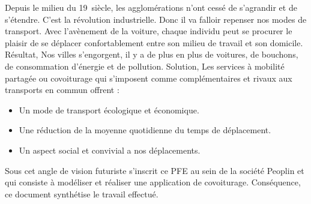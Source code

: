 
\begin{general}

\hspace{1cm}Depuis le milieu du 19\ieme\ siècle, les agglomérations n’ont cessé de s’agrandir et de s’étendre. C’est la révolution industrielle. Donc il va falloir repenser nos modes de transport.\newline
Avec l’avènement de la voiture, chaque individu peut se procurer le plaisir de se déplacer confortablement entre son milieu de travail et son domicile.\newline
Résultat, Nos villes s’engorgent, il y a de plus en plus de voitures, de bouchons, de consommation d’énergie et de pollution.\newline
Solution, Les services à mobilité partagée ou covoiturage qui s’imposent comme complémentaires et rivaux aux transports en commun offrent :
\begin{itemize}
\item Un mode de transport écologique et économique.
\item Une réduction de la moyenne quotidienne du temps de déplacement.
\item Un aspect social et convivial a nos déplacements.
\end{itemize}
Sous cet angle de vision futuriste s’inscrit ce PFE au sein de la société Peoplin et qui consiste à modéliser et réaliser une application de covoiturage.\newline
Conséquence, ce document synthétise le travail effectué.
\end{general}

